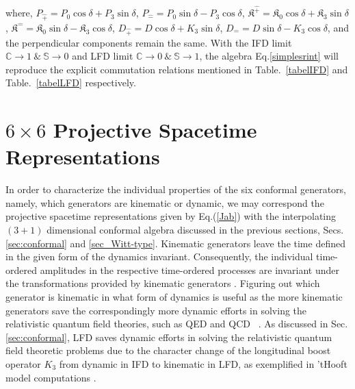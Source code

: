 \documentclass[%
 reprint,
superscriptaddress,
 amsmath,amssymb,
 aps,
]{revtex4-2}
\begin{document}
where, $P_{\hat{+}}=P_0\cos{\delta}+P_3\sin{\delta}$, $P_{\hat{-}}=P_0\sin{\delta}-P_3\cos{\delta}$, $
\mathfrak{K}^{\hat{+}}=\mathfrak{K}_0\cos{\delta}+\mathfrak{K}_3\sin{\delta}$, $\mathfrak{K}^{\hat{-}}=\mathfrak{K}_0\sin{\delta}-\mathfrak{K}_3\cos{\delta}$, $D_{\hat{+}}=D\cos\delta+K_3\sin\delta$, $D_{\hat{-}}=D\sin\delta-K_3\cos\delta$, and the perpendicular components remain the same. 
With the IFD limit $\mathbb{C}\longrightarrow1~\&~\mathbb{S}\longrightarrow0$ and LFD limit $\mathbb{C}\longrightarrow0~\&~\mathbb{S}\longrightarrow1$, the algebra Eq.\eqref{simplesrint} will reproduce the explicit commutation relations mentioned in Table.~\ref{tabelIFD} and Table.~\ref{tabelLFD} respectively.


\section{\texorpdfstring{$6\times6$}{TEXT} Projective Spacetime Representations}
\label{sec:projectivespace}
In order to characterize the individual properties of the six conformal generators, namely, which generators are kinematic or dynamic, we may correspond the projective spacetime representations 
given by Eq.(\ref{Jab}) with
the interpolating $(3+1)$ dimensional conformal algebra
discussed in the previous sections, Secs.\ref{sec:conformal} and \ref{sec_Witt-type}. 
Kinematic generators leave the time defined in the given form of the dynamics invariant.
Consequently, the individual time-ordered amplitudes in the respective time-ordered processes are invariant under the transformations provided by kinematic generators \cite{Ji2001}.
Figuring out which generator is kinematic in what form of dynamics is useful as the more kinematic generators save the correspondingly more dynamic efforts in solving the relativistic quantum field theories, such as QED and QCD~ \cite{ji2023relativistic}. As discussed in Sec.\ref{sec:conformal}, 
LFD saves dynamic efforts in solving the relativistic quantum field theoretic problems due to the character change of the longitudinal boost operator $K_3$ from dynamic in IFD to kinematic in LFD, as exemplified in 'tHooft model computations  \cite{THOOFT1974461, Ji2021QCD, ji2023relativistic}.
\end{document}
